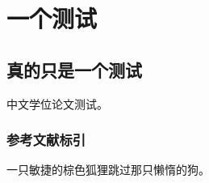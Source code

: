 
\chapter{一个测试}

\section{真的只是一个测试}

中文学位论文测试\cite{zhang2010tree}。

\subsection{参考文献标引}

一只敏捷的棕色狐狸跳过那只懒惰的狗\cite{deng:01a}。
